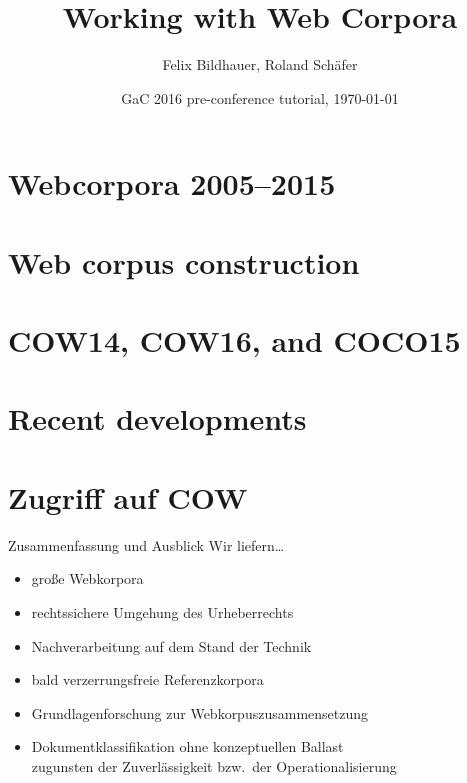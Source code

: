 \documentclass{beamer}
\title[Working with Web Corpora]{\Large Working with Web Corpora}
\author[Felix Bildhauer and Roland Schäfer]{\Large Felix Bildhauer, Roland Schäfer}
\institute{IDS Mannheim, FU Berlin}
\date{GaC 2016 pre-conference tutorial, \today}
\begin{document}
\fuberlintitlepage


\section{Webcorpora 2005--2015}



\section{Web corpus construction}



\section{COW14, COW16, and COCO15}






%


\section{Recent developments}

%
%


%
%
%
%
%
%
%
%
\section{Zugriff auf COW}




\begin{frame}
  {Zusammenfassung und Ausblick}
  Wir liefern\dots\\
  \begin{itemize}
    \item \alert{große Webkorpora}
    \item rechtssichere \alert{Umgehung des Urheberrechts}
    \item \alert{Nachverarbeitung} auf dem Stand der Technik
    \item bald \alert{verzerrungsfreie Referenzkorpora}
    \item Grundlagenforschung zur \alert{Webkorpuszusammensetzung}
    \item \alert{Dokumentklassifikation} ohne konzeptuellen Ballast\\
      zugunsten der Zuverlässigkeit bzw.\ der Operationalisierung
  \end{itemize}
\end{frame}
\end{document}

